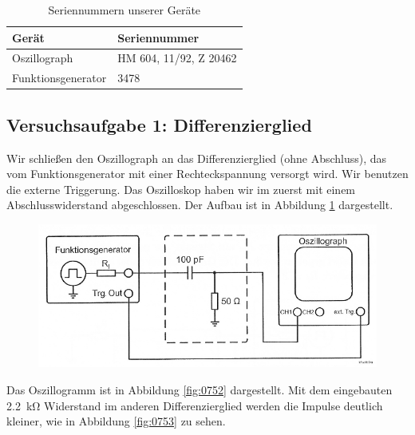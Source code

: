 \begin{table}[hb]
	\center
	\begin{tabular}{ll}
		Gerät & Seriennummer \\
		\hline
		Oszillograph & HM 604, 11/92, Z 20462 \\
		Funktionsgenerator & 3478 \\
	\end{tabular}
	\caption{Seriennummern unserer Geräte}
	\label{tb:seriennummern}
\end{table}

\FloatBarrier
\subsection{Versuchsaufgabe 1: Differenzierglied}

Wir schließen den Oszillograph an das Differenzierglied (ohne Abschluss), das
vom Funktionsgenerator mit einer Rechteckspannung versorgt wird. Wir benutzen
die externe Triggerung. Das Oszilloskop haben wir im zuerst mit einem
Abschlusswiderstand abgeschlossen. Der Aufbau ist in Abbildung \ref{fig:1-6}
dargestellt.

\begin{figure}[htbp]
	\centering
	\includegraphics[width=.7\textwidth]{Schaltplan/1-6.png}
	\caption{%
		\cite[Abbildung~1.6]{physik313-Anleitung}
	}
	\label{fig:1-6}
\end{figure}

Das Oszillogramm ist in Abbildung \ref{fig:0752} dargestellt. Mit dem
eingebauten \SI{2.2}{\kilo\ohm} Widerstand im anderen Differenzierglied werden
die Impulse deutlich kleiner, wie in Abbildung \ref{fig:0753} zu sehen.

